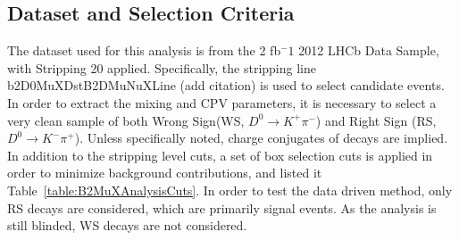 \documentclass[11pt]{article}%
\begin{document}
\begin{flushleft}
\begin{linenumbers}
\section{Dataset and Selection Criteria}
The dataset used for this analysis is from the 2 fb$^-1$ 2012 LHCb Data Sample, with Stripping 20 applied. Specifically, the stripping line b2D0MuXDstB2DMuNuXLine (add citation) is used to select candidate events. In order to extract the mixing and CPV parameters, it is necessary to select a very clean sample of both Wrong Sign(WS, $D^0\to K^+\pi^-$) and Right Sign (RS, $D^0\to K^-\pi^+$). Unless specifically noted, charge conjugates of decays are implied. In addition to the stripping level cuts, a set of box selection cuts is applied in order to minimize background contributions, and listed it Table~\ref{table:B2MuXAnalysisCuts}. In order to test the data driven method, only RS decays are considered, which are primarily signal events. As the analysis is still blinded, WS decays are not considered.


\end{linenumbers}
\end{flushleft}
\end{document}

